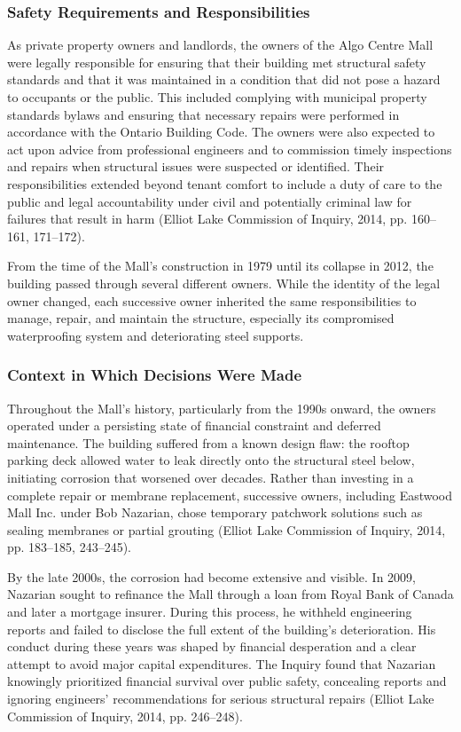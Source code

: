\documentclass[12pt]{article}
\begin{document}
\subsubsection*{Safety Requirements and Responsibilities}
As private property owners and landlords, the owners of the Algo Centre Mall were legally responsible for ensuring that their building met structural safety standards and that it was maintained in a condition that did not pose a hazard to occupants or the public. This included complying with municipal property standards bylaws and ensuring that necessary repairs were performed in accordance with the Ontario Building Code. The owners were also expected to act upon advice from professional engineers and to commission timely inspections and repairs when structural issues were suspected or identified. Their responsibilities extended beyond tenant comfort to include a duty of care to the public and legal accountability under civil and potentially criminal law for failures that result in harm (Elliot Lake Commission of Inquiry, 2014, pp. 160–161, 171–172).

From the time of the Mall’s construction in 1979 until its collapse in 2012, the building passed through several different owners. While the identity of the legal owner changed, each successive owner inherited the same responsibilities to manage, repair, and maintain the structure, especially its compromised waterproofing system and deteriorating steel supports.

\subsubsection*{Context in Which Decisions Were Made}
Throughout the Mall’s history, particularly from the 1990s onward, the owners operated under a persisting state of financial constraint and deferred maintenance. The building suffered from a known design flaw: the rooftop parking deck allowed water to leak directly onto the structural steel below, initiating corrosion that worsened over decades. Rather than investing in a complete repair or membrane replacement, successive owners, including Eastwood Mall Inc. under Bob Nazarian, chose temporary patchwork solutions such as sealing membranes or partial grouting (Elliot Lake Commission of Inquiry, 2014, pp. 183–185, 243–245).

By the late 2000s, the corrosion had become extensive and visible. In 2009, Nazarian sought to refinance the Mall through a loan from Royal Bank of Canada and later a mortgage insurer. During this process, he withheld engineering reports and failed to disclose the full extent of the building’s deterioration. His conduct during these years was shaped by financial desperation and a clear attempt to avoid major capital expenditures. The Inquiry found that Nazarian knowingly prioritized financial survival over public safety, concealing reports and ignoring engineers’ recommendations for serious structural repairs (Elliot Lake Commission of Inquiry, 2014, pp. 246–248).
\end{document}
